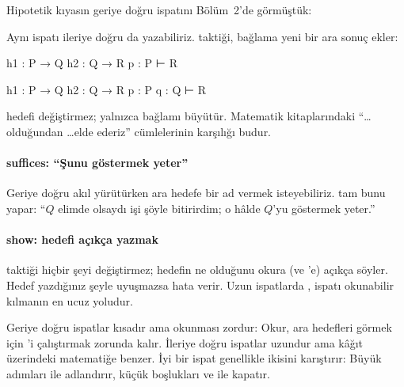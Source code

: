 Hipotetik kıyasın geriye doğru ispatını Bölüm~2'de görmüştük:


\noindent Aynı ispatı ileriye doğru da yazabiliriz. 
taktiği, bağlama yeni bir ara sonuç ekler:


\begin{hedefgecisi}
\begin{hedefdurumu}
h1 : P → Q
h2 : Q → R
p : P
⊢ R
\end{hedefdurumu}
\sonra
\begin{hedefdurumu}
h1 : P → Q
h2 : Q → R
p : P
q : Q
⊢ R
\end{hedefdurumu}
\end{hedefgecisi}

\noindent {} hedefi değiştirmez; yalnızca bağlamı
büyütür. Matematik kitaplarındaki ``\ldots olduğundan \ldots elde
ederiz'' cümlelerinin karşılığı budur.

\paragraph{suffices: ``Şunu göstermek yeter''}
Geriye doğru akıl yürütürken ara hedefe bir ad vermek isteyebiliriz.
 tam bunu yapar: ``$Q$ elimde olsaydı işi şöyle
bitirirdim; o hâlde $Q$'yu göstermek yeter.''


\paragraph{show: hedefi açıkça yazmak}
 taktiği hiçbir şeyi değiştirmez; hedefin ne olduğunu
okura (ve \Lean{}'e) açıkça söyler. Hedef yazdığınız şeyle uyuşmazsa
\Lean{} hata verir. Uzun ispatlarda , ispatı okunabilir
kılmanın en ucuz yoludur.


\begin{dikkat}
Geriye doğru ispatlar kısadır ama okunması zordur: Okur, ara hedefleri
görmek için \Lean{}'i çalıştırmak zorunda kalır. İleriye doğru ispatlar
uzundur ama kâğıt üzerindeki matematiğe benzer. İyi bir ispat genellikle
ikisini karıştırır: Büyük adımları  ile adlandırır, küçük
boşlukları  ve  ile kapatır.
\end{dikkat}

